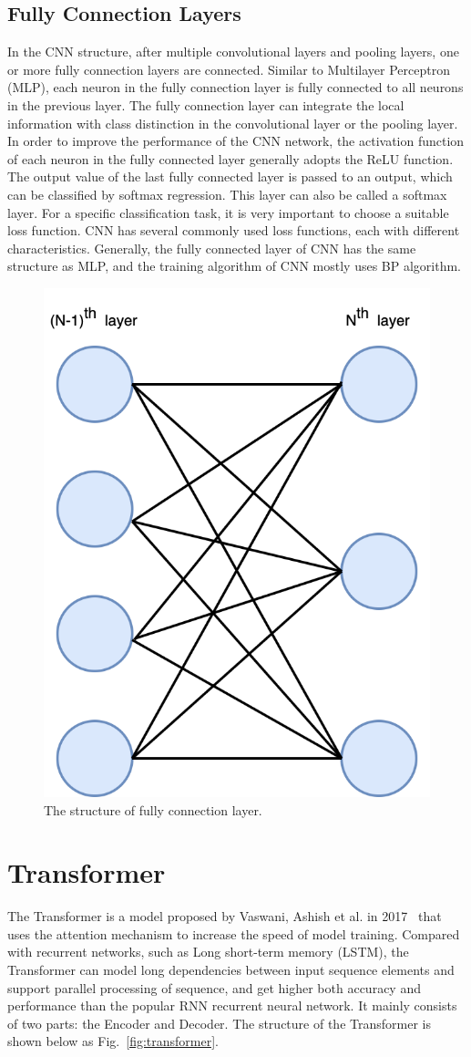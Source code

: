 \subsection{Fully Connection Layers}

In the CNN structure, after multiple convolutional layers and pooling layers, one or more fully connection layers are connected. Similar to Multilayer Perceptron (MLP), each neuron in the fully connection layer is fully connected to all neurons in the previous layer. The fully connection layer can integrate the local information with class distinction in the convolutional layer or the pooling layer. In order to improve the performance of the CNN network, the activation function of each neuron in the fully connected layer generally adopts the ReLU function. The output value of the last fully connected layer is passed to an output, which can be classified by softmax regression. This layer can also be called a softmax layer. For a specific classification task, it is very important to choose a suitable loss function. CNN has several commonly used loss functions, each with different characteristics. Generally, the fully connected layer of CNN has the same structure as MLP, and the training algorithm of CNN mostly uses BP algorithm.
\begin{figure}[H]
	\centering
	\includegraphics[width=0.4\linewidth]{figures/fc}
	\caption[The structure of fully connection layer]{The structure of fully connection layer.}
	\label{fig:fclayer}
\end{figure}


\section{Transformer}
\label{section:transformer}
The Transformer is a model proposed by Vaswani, Ashish et al. in 2017~\cite{vaswani2017attention}  that uses the attention mechanism to increase the speed of model training. Compared with recurrent networks, such as Long short-term memory (LSTM), the Transformer can model long dependencies between input sequence elements and support parallel processing of sequence, and get higher both accuracy and performance than the popular RNN recurrent neural network. It mainly consists of two parts: the Encoder and Decoder. The structure of the Transformer is shown below as Fig.~\ref{fig:transformer}.

